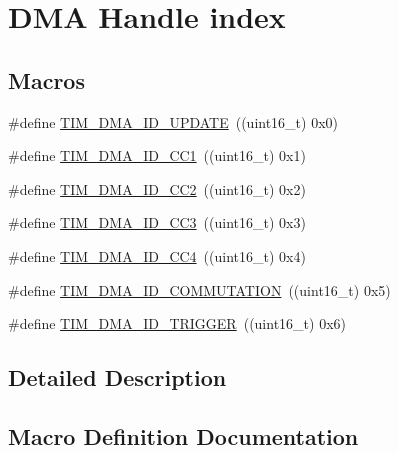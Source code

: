 \hypertarget{group___d_m_a___handle__index}{}\section{D\+MA Handle index}
\label{group___d_m_a___handle__index}
\subsection*{Macros}
\begin{DoxyCompactItemize}
\item 
\#define \hyperlink{group___d_m_a___handle__index_ga15f38cee11f8b2b5a85cbf4552ba140d}{T\+I\+M\+\_\+\+D\+M\+A\+\_\+\+I\+D\+\_\+\+U\+P\+D\+A\+TE}~((uint16\+\_\+t) 0x0)
\item 
\#define \hyperlink{group___d_m_a___handle__index_ga7ca691eb5e29b0206d3390cc6e90079a}{T\+I\+M\+\_\+\+D\+M\+A\+\_\+\+I\+D\+\_\+\+C\+C1}~((uint16\+\_\+t) 0x1)
\item 
\#define \hyperlink{group___d_m_a___handle__index_ga9c52f32d4bd21dd2d232900219f0a111}{T\+I\+M\+\_\+\+D\+M\+A\+\_\+\+I\+D\+\_\+\+C\+C2}~((uint16\+\_\+t) 0x2)
\item 
\#define \hyperlink{group___d_m_a___handle__index_ga6e8145f305b54744bf2ef379a4315a40}{T\+I\+M\+\_\+\+D\+M\+A\+\_\+\+I\+D\+\_\+\+C\+C3}~((uint16\+\_\+t) 0x3)
\item 
\#define \hyperlink{group___d_m_a___handle__index_ga1860c00b370435ff40d9e65f14a61706}{T\+I\+M\+\_\+\+D\+M\+A\+\_\+\+I\+D\+\_\+\+C\+C4}~((uint16\+\_\+t) 0x4)
\item 
\#define \hyperlink{group___d_m_a___handle__index_gaa707c98bb11277665635ca7aef1e4193}{T\+I\+M\+\_\+\+D\+M\+A\+\_\+\+I\+D\+\_\+\+C\+O\+M\+M\+U\+T\+A\+T\+I\+ON}~((uint16\+\_\+t) 0x5)
\item 
\#define \hyperlink{group___d_m_a___handle__index_ga39900e5227e4d813a726a1df5d86671c}{T\+I\+M\+\_\+\+D\+M\+A\+\_\+\+I\+D\+\_\+\+T\+R\+I\+G\+G\+ER}~((uint16\+\_\+t) 0x6)
\end{DoxyCompactItemize}


\subsection{Detailed Description}


\subsection{Macro Definition Documentation}
